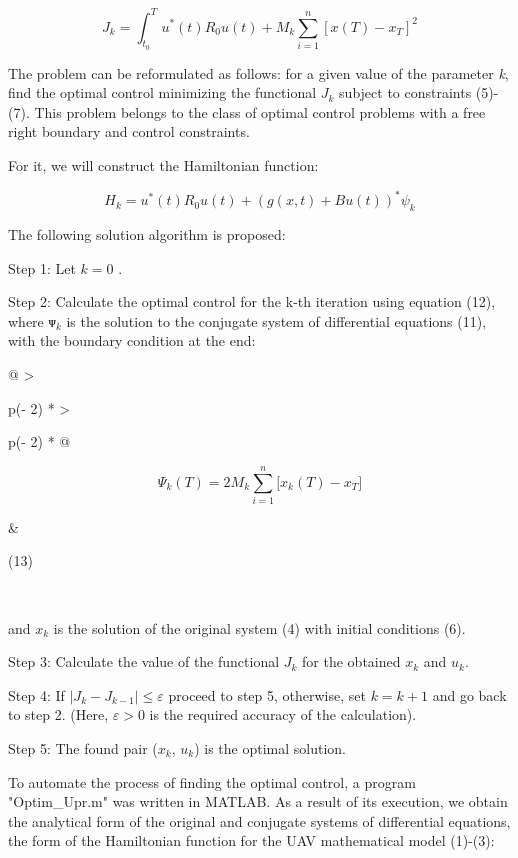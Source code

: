 \[J_{k} =  \int_{t_0}^T u^{*}(t)R_{0}u(t) + M_k\sum_{i=1}^n[x(T)-x_T]^2\]

The problem can be reformulated as follows: for a given value of the
parameter \emph{k}, find the optimal control minimizing the functional
\(J_{k}\)\hspace{0pt} subject to constraints (5)-(7). This problem
belongs to the class of optimal control problems with a free right
boundary and control constraints.

For it, we will construct the Hamiltonian function:

\[H_{k} = u^{*}(t)R_{0}u(t) + (g(x,t) + Bu(t))^{*}\psi_{k}\]

The following solution algorithm is proposed:

Step 1: Let \(k = 0\) .

Step 2: Calculate the optimal control for the k-th iteration using
equation (12), where \(ᴪ_{k}\) is the solution to the conjugate system
of differential equations (11), with the boundary condition at the end:

\begin{longtable}[]{@{}
  >{\raggedright\arraybackslash}p{(\columnwidth - 2\tabcolsep) * }
  >{\raggedright\arraybackslash}p{(\columnwidth - 2\tabcolsep) * }@{}}
\begin{minipage}[b]{\linewidth}\raggedright
\[\Psi_{k}(T) = 2M_{k}\sum_{i = 1}^{n}{\lbrack x_{k}(T) - x_{T}\rbrack}\]
\end{minipage} & \begin{minipage}[b]{\linewidth}\raggedright
(13)
\end{minipage} \\
\end{longtable}

and \(x_{k}\) is the solution of the original system (4) with initial
conditions (6).

Step 3: Calculate the value of the functional \(J_{k}\) for the obtained
\(x_{k}\) and \(u_{k}\).

Step 4: If \(\left| J_{k} - J_{k - 1} \right| \leq \varepsilon\) proceed
to step 5, otherwise, set \(k = k + 1\) and go back to step 2. (Here,
\(\varepsilon > 0\) is the required accuracy of the calculation).

Step 5: The found pair (\(x_{k}\), \(u_{k}\)) is the optimal solution.

To automate the process of finding the optimal control, a program
"Optim\_Upr.m" was written in MATLAB. As a result of its execution, we
obtain the analytical form of the original and conjugate systems of
differential equations, the form of the Hamiltonian function for the UAV
mathematical model (1)-(3):


